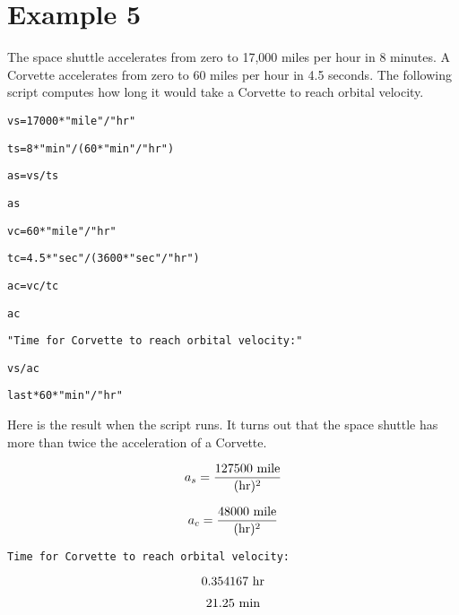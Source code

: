 
\newpage

\section*{Example 5}

The space shuttle accelerates from zero to 17{,}000 miles per hour
in 8 minutes.
A Corvette accelerates from zero to 60 miles per hour in 4.5 seconds.
The following script computes how long it would take a Corvette to
reach orbital velocity.

\medskip
\verb$vs=17000*"mile"/"hr"$

\verb$ts=8*"min"/(60*"min"/"hr")$

\verb$as=vs/ts$

\verb$as$

\verb$vc=60*"mile"/"hr"$

\verb$tc=4.5*"sec"/(3600*"sec"/"hr")$

\verb$ac=vc/tc$

\verb$ac$

\verb$"Time for Corvette to reach orbital velocity:"$

\verb$vs/ac$

\verb$last*60*"min"/"hr"$

\medskip
\noindent
Here is the result when the script runs.
It turns out that the space shuttle has more than twice the acceleration
of a Corvette.

\medskip
$$a_s={\hbox{127500 mile}\over(\hbox{hr})^2}$$

$$a_c={\hbox{48000 mile}\over(\hbox{hr})^2}$$

\verb$Time for Corvette to reach orbital velocity:$

$$\hbox{0.354167 hr}$$

$$\hbox{21.25 min}$$

